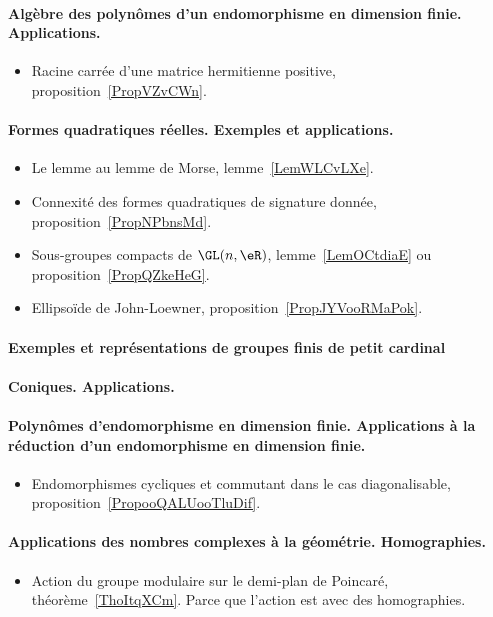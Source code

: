 \paragraph{Algèbre des polynômes d'un endomorphisme en dimension finie. Applications.}
\begin{itemize}
    \item Racine carrée d'une matrice hermitienne positive, proposition~\ref{PropVZvCWn}.
\end{itemize}
\paragraph{Formes quadratiques réelles. Exemples et applications.}
\begin{itemize}
    \item Le lemme au lemme de Morse, lemme~\ref{LemWLCvLXe}.
    \item Connexité des formes quadratiques de signature donnée, proposition~\ref{PropNPbnsMd}.
    \item Sous-groupes compacts de \( \GL(n,\eR)\), lemme~\ref{LemOCtdiaE} ou proposition~\ref{PropQZkeHeG}.
    \item Ellipsoïde de John-Loewner, proposition~\ref{PropJYVooRMaPok}.
\end{itemize}
\paragraph{Exemples et représentations de groupes finis de petit cardinal}
\paragraph{Coniques. Applications.}
\paragraph{Polynômes d'endomorphisme en dimension finie. Applications à la réduction d'un endomorphisme en dimension finie.}
\begin{itemize}
    \item Endomorphismes cycliques et commutant dans le cas diagonalisable, proposition~\ref{PropooQALUooTluDif}.
\end{itemize}
\paragraph{Applications des nombres complexes à la géométrie. Homographies.}
\begin{itemize}
    \item Action du groupe modulaire sur le demi-plan de Poincaré, théorème~\ref{ThoItqXCm}. Parce que l'action est avec des homographies.
\end{itemize}

